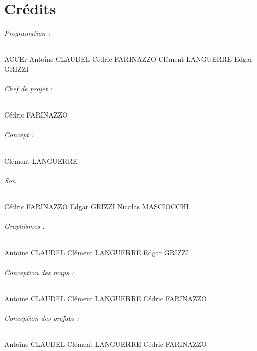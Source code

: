 \documentclass[titlepage, 13px, a4paper]{report}
\begin{document}

\part{Crédits} 
\paragraph*{Programation : } \hspace{0pt}
ACCEr
Antoine CLAUDEL
Cédric FARINAZZO
Clément LANGUERRE
Edgar GRIZZI \\

\paragraph*{Chef de projet : } \hspace{0pt}
Cédric FARINAZZO \\

\paragraph*{Concept : } \hspace{0pt}
Clément LANGUERRE \\

\paragraph*{Son} \hspace{0pt}
Cédric FARINAZZO
Edgar GRIZZI
Nicolas MASCIOCCHI \\

\paragraph*{Graphismes : } \hspace{0pt}
Antoine CLAUDEL
Clément LANGUERRE
Edgar GRIZZI \\

\paragraph*{Conception des maps : } \hspace{0pt}
Antoine CLAUDEL
Clément LANGUERRE
Cédric FARINAZZO \\

\paragraph*{Conception des préfabs : } \hspace{0pt}
Antoine CLAUDEL
Clément LANGUERRE
Cédric FARINAZZO \\
\end{document}
